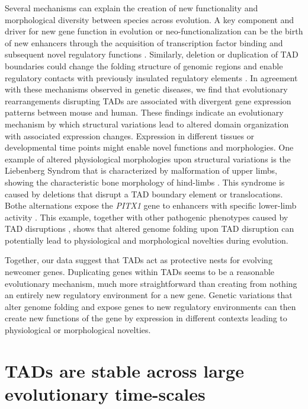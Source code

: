 \documentclass[a4paper,twoside=true,openright,parskip=full,chapterprefix=true,11pt,headings=normal,bibliography=totoc,listof=totoc,titlepage=on,captions=tableabove,draft=false]{scrreprt}
\theoremstyle{definition}
\theoremstyle{definition}
\theoremstyle{definition}
\theoremstyle{remark}
\begin{document}
Several mechanisms can explain the creation of new functionality and
morphological diversity between species across evolution. A key
component and driver for new gene function in evolution or
neo-functionalization can be the birth of new enhancers through the
acquisition of transcription factor binding and subsequent novel
regulatory functions \citep{Long2016}. Similarly, deletion or
duplication of TAD boundaries could change the folding structure of
genomic regions and enable regulatory contacts with previously insulated
regulatory elements \citep{Ibn-Salem2014, Lupianez2015, Franke2017}. In
agreement with these mechanisms observed in genetic diseases, we find
that evolutionary rearrangements disrupting TADs are associated with
divergent gene expression patterns between mouse and human. These
findings indicate an evolutionary mechanism by which structural
variations lead to altered domain organization with associated
expression changes. Expression in different tissues or developmental
time points might enable novel functions and morphologies. One example
of altered physiological morphologies upon structural variations is the
Liebenberg Syndrom that is characterized by malformation of upper limbs,
showing the characteristic bone morphology of hind-limbs
\citep{Spielmann2012}. This syndrome is caused by deletions that disrupt
a TAD boundary element or translocations. Bothe alternations expose the
\emph{PITX1} gene to enhancers with specific lower-limb activity
\citep{Spielmann2013a}. This example, together with other pathogenic
phenotypes caused by TAD disruptions
\citep{Lupianez2015, Franke2016, Flottmann2017}, shows that altered
genome folding upon TAD disruption can potentially lead to physiological
and morphological novelties during evolution.

Together, our data suggest that TADs act as protective nests for
evolving newcomer genes. Duplicating genes within TADs seems to be a
reasonable evolutionary mechanism, much more straightforward than
creating from nothing an entirely new regulatory environment for a new
gene. Genetic variations that alter genome folding and expose genes to
new regulatory environments can then create new functions of the gene by
expression in different contexts leading to physiological or
morphological novelties.

\hypertarget{tads-are-stable-across-large-evolutionary-time-scales}{%
\section{TADs are stable across large evolutionary
time-scales}\label{tads-are-stable-across-large-evolutionary-time-scales}}
\end{document}
